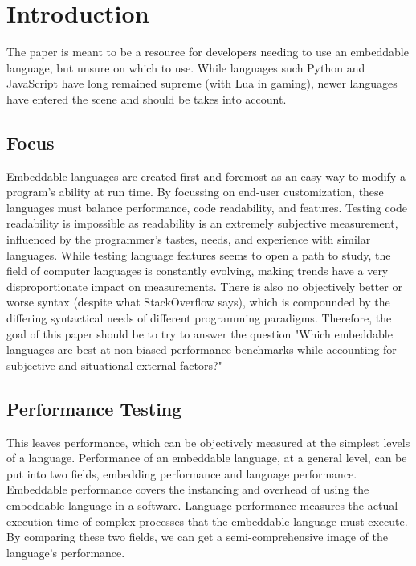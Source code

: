 \section{Introduction} \label{sec:introduction}
The paper is meant to be a resource for developers needing to use an embeddable language, but unsure on which to use. While languages such Python and JavaScript have long remained supreme (with Lua in gaming)\cite{trend:jslua}, newer languages have entered the scene and should be takes into account.

\subsection{Focus}
Embeddable languages are created first and foremost as an easy way to modify a program's ability at run time. By focussing on end-user customization, these languages must balance performance, code readability, and features. Testing code readability is impossible as readability is an extremely subjective measurement, influenced by the programmer's tastes, needs, and experience with similar languages. While testing language features seems to open a path to study, the field of computer languages is constantly evolving, making trends have a very disproportionate impact on measurements. There is also no objectively better or worse syntax (despite what StackOverflow says), which is compounded by the differing syntactical needs of different programming paradigms. Therefore, the goal of this paper should be to try to answer the question "Which embeddable languages are best at non-biased performance benchmarks while accounting for subjective and situational external factors?"

\subsection{Performance Testing}
This leaves performance, which can be objectively measured at the simplest levels of a language. Performance of an embeddable language, at a general level, can be put into two fields, embedding performance and language performance. Embeddable performance covers the instancing and overhead of using the embeddable language in a software. Language performance measures the actual execution time of complex processes that the embeddable language must execute. By comparing these two fields, we can get a semi-comprehensive image of the language's performance.

